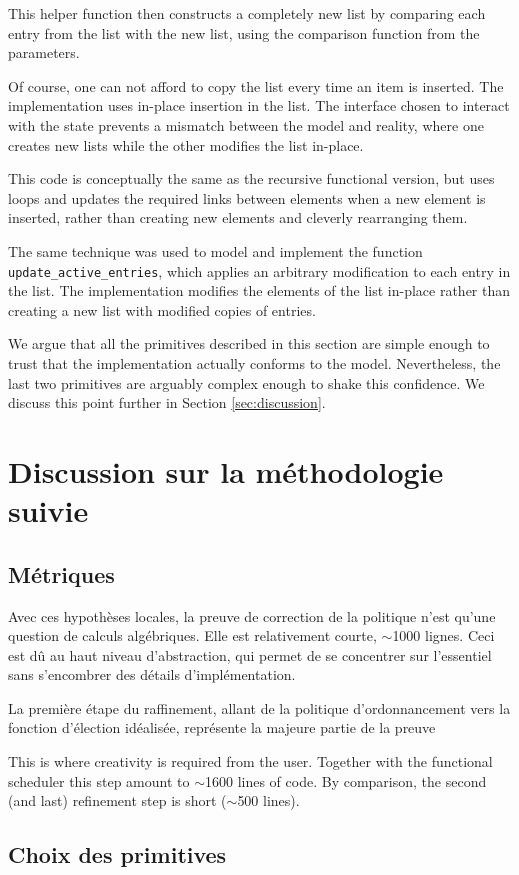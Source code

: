 	This helper function then constructs a completely new list by comparing each entry from the list with the new list, using the comparison function from the parameters. 

	Of course, one can not afford to copy the list every time an item is inserted. The implementation uses in-place insertion in the list. The interface chosen to interact with the state prevents a mismatch between the model and reality, where one creates new lists while the other modifies the list in-place.

	This code is conceptually the same as the recursive functional version, but uses loops and updates the required links between elements when a new element is inserted, rather than creating new elements and cleverly rearranging them.

	The same technique was used to model and implement the function \texttt{update\_active\_entries}, which applies an arbitrary modification to each entry in the list. The implementation modifies the elements of the list in-place rather than creating a new list with modified copies of entries.

	\label{sec:implementation}

	We argue that all the primitives described in this section are simple enough to trust that the implementation actually conforms to the model. Nevertheless, the last two primitives are arguably complex enough to shake this confidence. We discuss this point further in Section \ref{sec:discussion}.

	\section{Discussion sur la méthodologie suivie}
		\subsection{Métriques}
		Avec ces hypothèses locales, la preuve de correction de la politique n'est qu'une question de calculs algébriques. Elle est relativement courte, $\sim$1000 lignes. Ceci est dû au haut niveau d'abstraction, qui permet de se concentrer sur l'essentiel sans s'encombrer des détails d'implémentation.
		
		La première étape du raffinement, allant de la politique d'ordonnancement vers la fonction d'élection idéalisée, représente la majeure partie de la preuve

		This is where creativity is required from the user. Together with the functional scheduler this step amount to $\sim$1600 lines of code.
		By comparison, the second (and last) refinement step is short ($\sim$500 lines). 
		\subsection{Choix des primitives}
		\label{sec:interfaceTCB}
